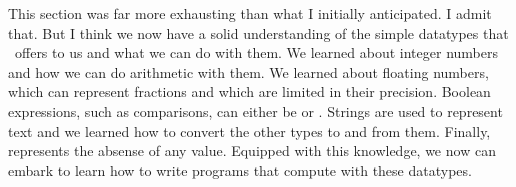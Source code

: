 %
%
This section was far more exhausting than what I initially anticipated.
I admit that.
But I think we now have a solid understanding of the simple datatypes that \python\ offers to us and what we can do with them.
We learned about integer numbers and how we can do arithmetic with them.
We learned about floating numbers, which can represent fractions and which are limited in their precision.
Boolean expressions, such as comparisons, can either be  or .
Strings are used to represent text and we learned how to convert the other types to and from them.
Finally,  represents the absense of any value.
Equipped with this knowledge, we now can embark to learn how to write programs that compute with these datatypes.%
%
\endhsection%
%
